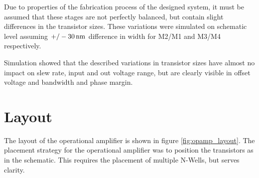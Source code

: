 \documentclass[parskip,oneside,colorbacktitle,10pt,accentcolor=tud1b,table]{tudreport}
\begin{document}
{Due to properties of the fabrication process of the designed system, it must be assumed that these stages are not perfectly balanced, but contain slight differences in the transistor sizes. These variations were simulated on schematic level assuming $+/-\unit[30]{nm}$ difference in width for M2/M1 and M3/M4 respectively.

Simulation showed that the described variations in transistor sizes have almost no impact on slew rate, input and out voltage range, but are clearly visible in offset voltage and bandwidth and phase margin.

\begin{figure}[H]
     \begin{center}
    \end{center}
\end{figure}

\section{Layout}

The layout of the operational amplifier is shown in figure \ref{fig:opamp_layout}. The placement strategy for the operational amplifier was to position the transistors as in the schematic. This requires the placement of multiple N-Wells, but serves clarity.

}
\end{document}

